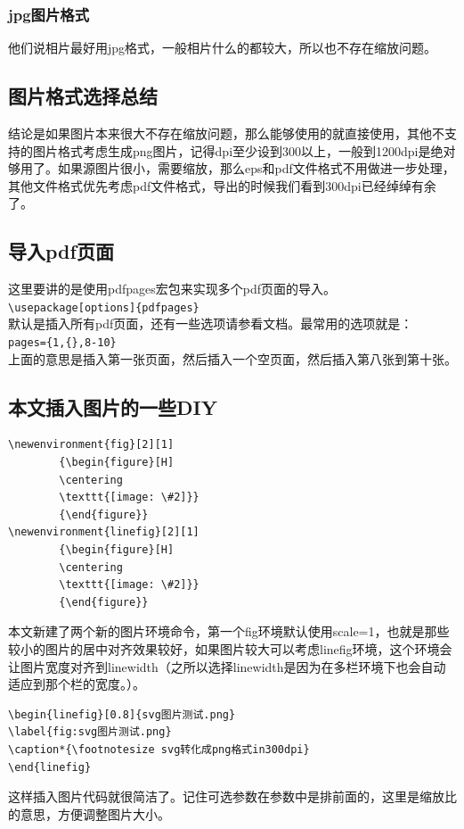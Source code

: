 \documentclass[12pt,oneside]{book}
\begin{document}
\begin{common-format}
\subsubsection{jpg图片格式}
他们说相片最好用jpg格式，一般相片什么的都较大，所以也不存在缩放问题。

\subsection{图片格式选择总结}
结论是如果图片本来很大不存在缩放问题，那么能够使用的就直接使用，其他不支持的图片格式考虑生成png图片，记得dpi至少设到300以上，一般到1200dpi是绝对够用了。如果源图片很小，需要缩放，那么eps和pdf文件格式不用做进一步处理，其他文件格式优先考虑pdf文件格式，导出的时候我们看到300dpi已经绰绰有余了。

\subsection{导入pdf页面}
这里要讲的是使用pdfpages宏包来实现多个pdf页面的导入。\\
\verb+\usepackage[options]{pdfpages} +\\
默认是插入所有pdf页面，还有一些选项请参看文档。最常用的选项就是：\\
\verb+pages={1,{},8-10}+\\
上面的意思是插入第一张页面，然后插入一个空页面，然后插入第八张到第十张。

\subsection{本文插入图片的一些DIY}
\begin{Verbatim}
\newenvironment{fig}[2][1]
        {\begin{figure}[H]
        \centering
        \texttt{[image: \#2]}}
        {\end{figure}}
\newenvironment{linefig}[2][1]
        {\begin{figure}[H]
        \centering
        \texttt{[image: \#2]}}
        {\end{figure}}
\end{Verbatim}

本文新建了两个新的图片环境命令，第一个fig环境默认使用scale=1，也就是那些较小的图片的居中对齐效果较好，如果图片较大可以考虑linefig环境，这个环境会让图片宽度对齐到linewidth（之所以选择linewidth是因为在多栏环境下也会自动适应到那个栏的宽度。）。

\begin{Verbatim}
\begin{linefig}[0.8]{svg图片测试.png}
\label{fig:svg图片测试.png}
\caption*{\footnotesize svg转化成png格式in300dpi}
\end{linefig}
\end{Verbatim}
这样插入图片代码就很简洁了。记住可选参数在参数中是排前面的，这里是缩放比的意思，方便调整图片大小。








\end{common-format}
\end{document}
